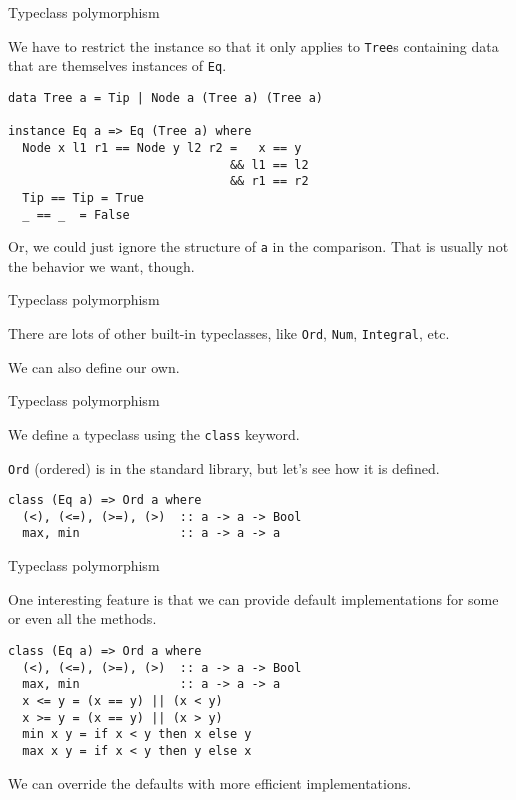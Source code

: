 %
\begin{frame}[fragile]{Typeclass polymorphism}

We have to restrict the instance so that it only applies to \texttt{Tree}s
containing data that are themselves instances of \texttt{Eq}.

\begin{block}{}
\begin{verbatim}
data Tree a = Tip | Node a (Tree a) (Tree a)

instance Eq a => Eq (Tree a) where
  Node x l1 r1 == Node y l2 r2 =   x == y 
                               && l1 == l2 
                               && r1 == r2
  Tip == Tip = True
  _ == _  = False
\end{verbatim}
\end{block}

Or, we could just ignore the structure of \texttt{a} in the comparison. That is
usually not the behavior we want, though.

\end{frame}

%
\begin{frame}[fragile]{Typeclass polymorphism}

There are lots of other built-in typeclasses, like \texttt{Ord}, \texttt{Num},
\texttt{Integral}, etc.

We can also define our own.

\end{frame}

%
\begin{frame}[fragile]{Typeclass polymorphism}

We define a typeclass using the \texttt{class} keyword.

\texttt{Ord} (ordered) is in the standard library, but let's see how it is
defined.

\begin{block}{}
\begin{verbatim}
class (Eq a) => Ord a where
  (<), (<=), (>=), (>)  :: a -> a -> Bool
  max, min              :: a -> a -> a
\end{verbatim}
\end{block}

\end{frame}

%
\begin{frame}[fragile]{Typeclass polymorphism}

One interesting feature is that we can provide default implementations for some
or even all the methods.

\begin{block}{}
\begin{verbatim}
class (Eq a) => Ord a where
  (<), (<=), (>=), (>)  :: a -> a -> Bool
  max, min              :: a -> a -> a
  x <= y = (x == y) || (x < y)
  x >= y = (x == y) || (x > y)
  min x y = if x < y then x else y
  max x y = if x < y then y else x
\end{verbatim}
\end{block}

We can override the defaults with more efficient implementations.

\end{frame}


